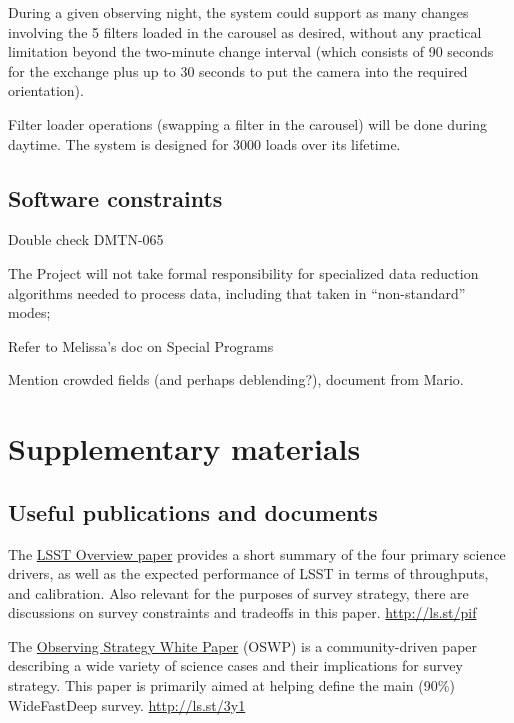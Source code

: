 \documentclass[DM,lsstdraft,toc,usenatbib]{lsstdoc}
\begin{document}
During a given observing night, the system could support as many changes involving the 5 filters loaded in the carousel as desired, without any practical limitation beyond the two-minute change interval (which consists of 90 seconds for the exchange plus up to 30 seconds to put the camera into the required orientation). 

Filter loader operations (swapping a filter in the carousel) will be done during daytime. The system is designed for 3000 loads over its lifetime. 




\subsection{Software constraints} 

Double check DMTN-065

The Project will not take formal responsibility for specialized data reduction algorithms 
needed to process data, including that taken in ``non-standard'' modes; 
   
Refer to Melissa's doc on Special Programs 

Mention crowded fields (and perhaps deblending?), document from Mario. 



\section{Supplementary materials} 


\subsection{Useful publications and documents}

The \href{https://www.lsst.org/content/lsst-science-drivers-reference-design-and-anticipated-data-products}{LSST Overview paper} provides a short summary of the four primary science drivers, as well as the expected performance of LSST in terms of throughputs, and calibration. Also relevant for the purposes of survey strategy, there are discussions on survey constraints and tradeoffs in this paper.  \url{http://ls.st/pif}

The \href{https://github.com/LSSTScienceCollaborations/ObservingStrategy}{Observing Strategy White Paper}  (OSWP) is a community-driven paper describing a wide variety of science cases and their implications for survey strategy. This paper is primarily aimed at helping define the main (90\%) WideFastDeep survey. \url{http://ls.st/3y1}
\end{document}
